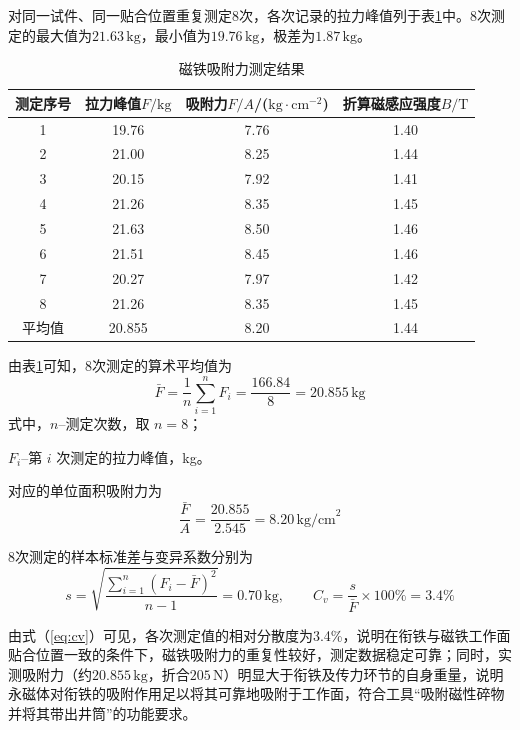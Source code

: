 对同一试件、同一贴合位置重复测定8次，各次记录的拉力峰值列于表\ref{tab:magnet_adsorption_force}中。8次测定的最大值为$21.63\,\text{kg}$，最小值为$19.76\,\text{kg}$，极差为$1.87\,\text{kg}$。

\begin{table}[htbp]
	\centering
	\caption{磁铁吸附力测定结果}
	\label{tab:magnet_adsorption_force}
	\renewcommand{\arraystretch}{1.3}
	\begin{tabular}{cccc}
		\toprule
		测定序号 & 拉力峰值$F/\text{kg}$ & 吸附力$F/A$/($\text{kg}\cdot\text{cm}^{-2}$) & 折算磁感应强度$B/\text{T}$ \\
		\midrule
		1 & 19.76 & 7.76 & 1.40 \\
		2 & 21.00 & 8.25 & 1.44 \\
		3 & 20.15 & 7.92 & 1.41 \\
		4 & 21.26 & 8.35 & 1.45 \\
		5 & 21.63 & 8.50 & 1.46 \\
		6 & 21.51 & 8.45 & 1.46 \\
		7 & 20.27 & 7.97 & 1.42 \\
		8 & 21.26 & 8.35 & 1.45 \\
		\midrule
		平均值 & 20.855 & 8.20 & 1.44 \\
		\bottomrule
	\end{tabular}
\end{table}

由表\ref{tab:magnet_adsorption_force}可知，8次测定的算术平均值为
\begin{equation}
	\bar F=\frac{1}{n}\sum_{i=1}^{n}F_i=\frac{166.84}{8}=20.855\,\text{kg}
\end{equation}
式中，$n$--测定次数，取 $n=8$；

$F_i$--第 $i$ 次测定的拉力峰值，kg。

对应的单位面积吸附力为
\begin{equation}
	\frac{\bar F}{A}=\frac{20.855}{2.545}=8.20\,\text{kg/cm}^2
\end{equation}

8次测定的样本标准差与变异系数分别为
\begin{equation}
	s=\sqrt{\frac{\sum_{i=1}^{n}(F_i-\bar F)^2}{n-1}}=0.70\,\text{kg},\qquad
	C_v=\frac{s}{\bar F}\times 100\%=3.4\%
	\label{eq:cv}
\end{equation}

由式（\ref{eq:cv}）可见，各次测定值的相对分散度为3.4\%，说明在衔铁与磁铁工作面贴合位置一致的条件下，磁铁吸附力的重复性较好，测定数据稳定可靠；同时，实测吸附力（约$20.855\,\text{kg}$，折合$205\,\text{N}$）明显大于衔铁及传力环节的自身重量，说明永磁体对衔铁的吸附作用足以将其可靠地吸附于工作面，符合工具“吸附磁性碎物并将其带出井筒”的功能要求。


